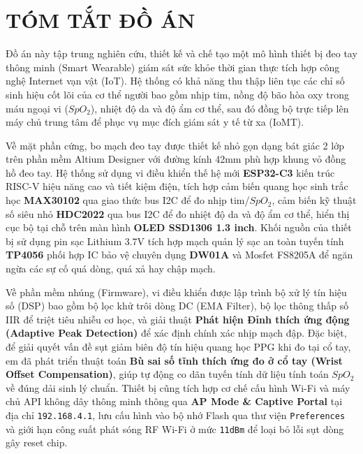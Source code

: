 \section*{TÓM TẮT ĐỒ ÁN}
\thispagestyle{empty}

Đồ án này tập trung nghiên cứu, thiết kế và chế tạo một mô hình thiết bị đeo tay thông minh (Smart Wearable) giám sát sức khỏe thời gian thực tích hợp công nghệ Internet vạn vật (IoT). Hệ thống có khả năng thu thập liên tục các chỉ số sinh hiệu cốt lõi của cơ thể người bao gồm nhịp tim, nồng độ bão hòa oxy trong máu ngoại vi ($SpO_2$), nhiệt độ da và độ ẩm cơ thể, sau đó đồng bộ trực tiếp lên máy chủ trung tâm để phục vụ mục đích giám sát y tế từ xa (IoMT).

Về mặt phần cứng, bo mạch đeo tay được thiết kế nhỏ gọn dạng bát giác 2 lớp trên phần mềm Altium Designer với đường kính 42mm phù hợp khung vỏ đồng hồ đeo tay. Hệ thống sử dụng vi điều khiển thế hệ mới \textbf{ESP32-C3} kiến trúc RISC-V hiệu năng cao và tiết kiệm điện, tích hợp cảm biến quang học sinh trắc học \textbf{MAX30102} qua giao thức bus I2C để đo nhịp tim/$SpO_2$, cảm biến kỹ thuật số siêu nhỏ \textbf{HDC2022} qua bus I2C để đo nhiệt độ da và độ ẩm cơ thể, hiển thị cục bộ tại chỗ trên màn hình \textbf{OLED SSD1306 1.3 inch}. Khối nguồn của thiết bị sử dụng pin sạc Lithium 3.7V tích hợp mạch quản lý sạc an toàn tuyến tính \textbf{TP4056} phối hợp IC bảo vệ chuyên dụng \textbf{DW01A} và Mosfet FS8205A để ngăn ngừa các sự cố quá dòng, quá xả hay chập mạch.

Về phần mềm nhúng (Firmware), vi điều khiển được lập trình bộ xử lý tín hiệu số (DSP) bao gồm bộ lọc khử trôi dòng DC (EMA Filter), bộ lọc thông thấp số IIR để triệt tiêu nhiễu cơ học, và giải thuật \textbf{Phát hiện Đỉnh thích ứng động (Adaptive Peak Detection)} để xác định chính xác nhịp mạch đập. Đặc biệt, để giải quyết vấn đề sụt giảm biên độ tín hiệu quang học PPG khi đo tại cổ tay, em đã phát triển thuật toán \textbf{Bù sai số tĩnh thích ứng đo ở cổ tay (Wrist Offset Compensation)}, giúp tự động co dãn tuyến tính dữ liệu tính toán $SpO_2$ về đúng dải sinh lý chuẩn. Thiết bị cũng tích hợp cơ chế cấu hình Wi-Fi và máy chủ API không dây thông minh thông qua \textbf{AP Mode \& Captive Portal} tại địa chỉ \texttt{192.168.4.1}, lưu cấu hình vào bộ nhớ Flash qua thư viện \texttt{Preferences} và giới hạn công suất phát sóng RF Wi-Fi ở mức \texttt{11dBm} để loại bỏ lỗi sụt dòng gây reset chip.

